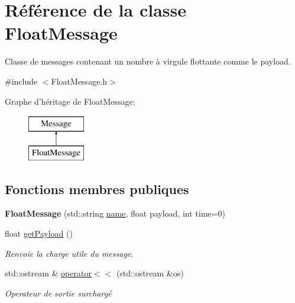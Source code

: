 \hypertarget{classFloatMessage}{\section{Référence de la classe Float\-Message}
\label{classFloatMessage}
}


Classe de messages contenant un nombre à virgule flottante comme le payload.  




{\ttfamily \#include $<$Float\-Message.\-h$>$}

Graphe d'héritage de Float\-Message\-:\begin{figure}[H]
\begin{center}
\leavevmode
\includegraphics[height=2.000000cm]{classFloatMessage}
\end{center}
\end{figure}
\subsection*{Fonctions membres publiques}
\begin{DoxyCompactItemize}
\item 
\hypertarget{classFloatMessage_afad013afd6c0a51064e3df019c2ec6a5}{{\bfseries Float\-Message} (std\-::string \hyperlink{classMessage_ac7adddb666acdc47c48f684bd6810a51}{name}, float payload, int time=0)}\label{classFloatMessage_afad013afd6c0a51064e3df019c2ec6a5}

\item 
\hypertarget{classFloatMessage_a9b3814111c4194bc64a14f51dc4d10ce}{float \hyperlink{classFloatMessage_a9b3814111c4194bc64a14f51dc4d10ce}{get\-Payload} ()}\label{classFloatMessage_a9b3814111c4194bc64a14f51dc4d10ce}

\begin{DoxyCompactList}\small\item\em Renvoie la charge utile du message. \end{DoxyCompactList}\item 
\hypertarget{classFloatMessage_a8522c594c26e327e92546913d4ab4f4a}{std\-::ostream \& \hyperlink{classFloatMessage_a8522c594c26e327e92546913d4ab4f4a}{operator$<$$<$} (std\-::ostream \&os)}\label{classFloatMessage_a8522c594c26e327e92546913d4ab4f4a}

\begin{DoxyCompactList}\small\item\em Operateur de sortie surchargé \end{DoxyCompactList}\end{DoxyCompactItemize}

